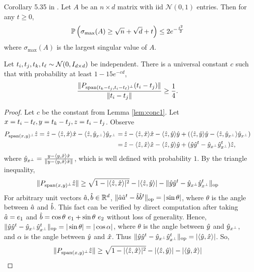 \begin{lemma}
\label{lem:conc2}
Corollary 5.35 in \cite{Vershynin}. Let $A$ be an $n \times d$ matrix with iid $\mathcal{N}(0,1)$ entries. Then for any $t\geq 0$,
\[
\P\left( \sigma_{\text{max}}(A) \geq \sqrt{n} + \sqrt{d} + t \right) \leq 2e^{-\frac{t^2}{2}}
\]
where $\sigma_{\max}(A)$ is the largest singular value of $A$.
\end{lemma}


\begin{lemma} \label{lem-beta-first}
Let $\ti, \tj, \tk, \tl \sim \mathcal{N}(0, I_{d \times d})$ be independent.  There is a universal constant $c$ such that with probability at least $1 - 15 e^{-cd}$,
$$
\frac{\|\proj_{\Span(\tk - \tj, \ti - \tl)^\perp} (\ti - \tj) \|}{\| \ti - \tj\|} \geq \frac{1}{4}.
$$
\end{lemma}
\begin{proof}
Let $c$ be the constant from Lemma \ref{lem:conc1}.
Let $x = \ti - \tl, y = \tk -\tj , z = \ti - \tj$.  Observe
\begin{align*}
\proj_{\Span(x,y)^\perp} \zhat  
= \zhat - \langle \zhat, \xhat \rangle \xhat - \langle \zhat, \yxphat \rangle \yxphat 
=&\, \zhat - \langle \zhat, \xhat \rangle \xhat - \langle \zhat, \yhat \rangle \yhat + (\langle \zhat, \yhat \rangle \yhat - \langle \zhat, \yxphat \rangle \yxphat) \\
  =&\, \zhat - \langle \zhat, \xhat \rangle \xhat - \langle \zhat, \yhat \rangle \yhat +(\yhat \yhat^t - \yxphat \yxphat^t ) \zhat,
\end{align*}
where $\yxphat = \frac{y - \langle y, \xhat \rangle \xhat}{\|y - \langle y, \xhat \rangle \xhat \|}$, which is well defined with probability $1$.  By the triangle inequality,
$$
\| \proj_{\Span(x,y)^\perp} \zhat \| \geq \sqrt{1 - | \langle \zhat, \xhat \rangle |^2} - | \langle \zhat, \yhat \rangle |  - \| \yhat \yhat^t - \yxphat \yxphat^t \|_{\text{op}}
$$
For arbitrary unit vectors $\ahat, \bhat \in \R^d$,  $\| \ahat \ahat^t - \bhat \bhat^t\|_\text{op} =  |\sin \theta|$, where $\theta$ is the angle between $\ahat$ and $\bhat$.  This fact can be verified by direct computation after taking $\ahat = e_1$ and $\bhat = \cos \theta \ e_1 + \sin \theta \ e_2$ without loss of generality.  Hence, $\| \yhat \yhat^t - \yxphat \yxphat^t\|_\text{op} =  | \sin \theta | =  | \cos \alpha |$, where $\theta$ is the angle between $\yhat$ and $\yxphat$, and $\alpha$ is the angle between $\yhat$ and $\xhat$.  Thus $\| \yhat \yhat^t - \yxphat \yxphat^t\|_\text{op} = | \langle \yhat, \xhat \rangle|$. 
So, 
$$
\| \proj_{\Span(x,y)^\perp} \zhat \| \geq \sqrt{1 - | \langle \zhat, \xhat \rangle |^2} - | \langle \zhat, \yhat \rangle | - | \langle \yhat, \xhat \rangle |
$$
\end{proof}

